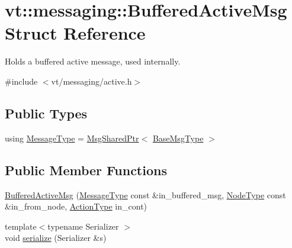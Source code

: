 \hypertarget{structvt_1_1messaging_1_1_buffered_active_msg}{}\section{vt\+:\+:messaging\+:\+:Buffered\+Active\+Msg Struct Reference}
\label{structvt_1_1messaging_1_1_buffered_active_msg}


Holds a buffered active message, used internally.  




{\ttfamily \#include $<$vt/messaging/active.\+h$>$}

\subsection*{Public Types}
\begin{DoxyCompactItemize}
\item 
using \hyperlink{structvt_1_1messaging_1_1_buffered_active_msg_a36c6d58d477907e916a251fb358f9154}{Message\+Type} = \hyperlink{structvt_1_1messaging_1_1_msg_shared_ptr}{Msg\+Shared\+Ptr}$<$ \hyperlink{namespacevt_a44d0d4e144748f2b19a1cfd962f50338}{Base\+Msg\+Type} $>$
\end{DoxyCompactItemize}
\subsection*{Public Member Functions}
\begin{DoxyCompactItemize}
\item 
\hyperlink{structvt_1_1messaging_1_1_buffered_active_msg_a76b964a87805d59f20d0cbf861f546a2}{Buffered\+Active\+Msg} (\hyperlink{structvt_1_1messaging_1_1_buffered_active_msg_a36c6d58d477907e916a251fb358f9154}{Message\+Type} const \&in\+\_\+buffered\+\_\+msg, \hyperlink{namespacevt_a866da9d0efc19c0a1ce79e9e492f47e2}{Node\+Type} const \&in\+\_\+from\+\_\+node, \hyperlink{namespacevt_ae0a5a7b18cc99d7b732cb4d44f46b0f3}{Action\+Type} in\+\_\+cont)
\item 
{\footnotesize template$<$typename Serializer $>$ }\\void \hyperlink{structvt_1_1messaging_1_1_buffered_active_msg_ad94bdc76553889e9c87c35d5bec945f2}{serialize} (Serializer \&s)
\end{DoxyCompactItemize}
